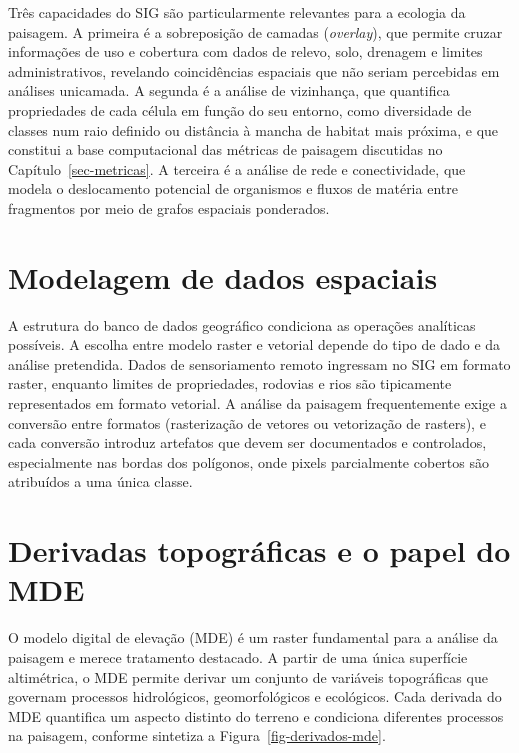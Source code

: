 \documentclass[
  portuguese,
  11pt,
  a4paper,
  open=any]{scrbook}
\begin{document}
Três capacidades do SIG são particularmente relevantes para a ecologia
da paisagem. A primeira é a sobreposição de camadas (\emph{overlay}),
que permite cruzar informações de uso e cobertura com dados de relevo,
solo, drenagem e limites administrativos, revelando coincidências
espaciais que não seriam percebidas em análises unicamada. A segunda é a
análise de vizinhança, que quantifica propriedades de cada célula em
função do seu entorno, como diversidade de classes num raio definido ou
distância à mancha de habitat mais próxima, e que constitui a base
computacional das métricas de paisagem discutidas no
Capítulo~\ref{sec-metricas}. A terceira é a análise de rede e
conectividade, que modela o deslocamento potencial de organismos e
fluxos de matéria entre fragmentos por meio de grafos espaciais
ponderados.

\section{Modelagem de dados
espaciais}\label{modelagem-de-dados-espaciais}

A estrutura do banco de dados geográfico condiciona as operações
analíticas possíveis. A escolha entre modelo raster e vetorial depende
do tipo de dado e da análise pretendida. Dados de sensoriamento remoto
ingressam no SIG em formato raster, enquanto limites de propriedades,
rodovias e rios são tipicamente representados em formato vetorial. A
análise da paisagem frequentemente exige a conversão entre formatos
(rasterização de vetores ou vetorização de rasters), e cada conversão
introduz artefatos que devem ser documentados e controlados,
especialmente nas bordas dos polígonos, onde pixels parcialmente
cobertos são atribuídos a uma única classe.

\section{Derivadas topográficas e o papel do
MDE}\label{derivadas-topogruxe1ficas-e-o-papel-do-mde}

O modelo digital de elevação (MDE) é um raster fundamental para a
análise da paisagem e merece tratamento destacado. A partir de uma única
superfície altimétrica, o MDE permite derivar um conjunto de variáveis
topográficas que governam processos hidrológicos, geomorfológicos e
ecológicos. Cada derivada do MDE quantifica um aspecto distinto do
terreno e condiciona diferentes processos na paisagem, conforme
sintetiza a Figura~\ref{fig-derivados-mde}.
\end{document}

